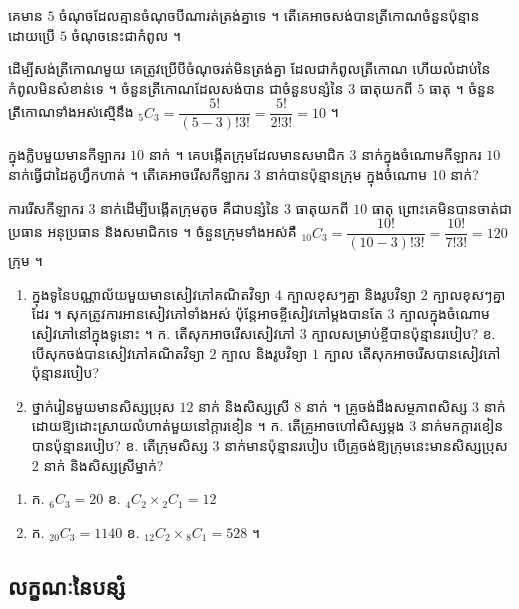 \begin{example}[លំហាត់គំរូ ១]
គេមាន $5$ ចំណុចដែលគ្មានចំណុចបីណារត់ត្រង់គ្នាទេ ។ តើគេអាចសង់បានត្រីកោណចំនួនប៉ុន្មាន ដោយប្រើ $5$ ចំណុចនេះជាកំពូល ។
\end{example}
\ans
ដើម្បីសង់ត្រីកោណមួយ គេត្រូវប្រើបីចំណុចរត់មិនត្រង់គ្នា ដែលជាកំពូលត្រីកោណ ហើយលំដាប់នៃកំពូលមិនសំខាន់ទេ ។ ចំនួនត្រីកោណដែលសង់បាន ជាចំនួនបន្សំនៃ $3$ ធាតុយកពី $5$ ធាតុ ។ ចំនួនត្រីកោណទាំងអស់ស្មើនឹង ${}_5C_3 = \dfrac{5!}{(5 - 3)!3!} = \dfrac{5!}{2!3!} = 10$ ។

\begin{example}[លំហាត់គំរូ ២]
ក្នុងក្លិបមួយមានកីឡាករ $10$ នាក់ ។ គេបង្កើតក្រុមដែលមានសមាជិក $3$ នាក់ក្នុងចំណោមកីឡាករ $10$ នាក់ធ្វើជាដៃគូហ្វឹកហាត់ ។ តើគេអាចរើសកីឡាករ $3$ នាក់បានប៉ុន្មានក្រុម ក្នុងចំណោម $10$ នាក់?
\end{example}
\ans
ការរើសកីឡាករ $3$ នាក់ដើម្បីបង្កើតក្រុមតូច គឺជាបន្សំនៃ $3$ ធាតុយកពី $10$ ធាតុ ព្រោះគេមិនបានចាត់ជាប្រធាន អនុប្រធាន និងសមាជិកទេ ។ ចំនួនក្រុមទាំងអស់គឺ ${}_{10}C_3 = \dfrac{10!}{(10 - 3)!3!} = \dfrac{10!}{7!3!} = 120$ ក្រុម ។

\begin{pro}
\begin{enumerate}[1]
  \item ក្នុងទូនៃបណ្ណាល័យមួយមានសៀវភៅគណិតវិទ្យា $4$ ក្បាលខុសៗគ្នា និងរូបវិទ្យា $2$ ក្បាលខុសៗគ្នាដែរ ។ សុកត្រូវការអានសៀវភៅទាំងអស់ ប៉ុន្តែអាចខ្ចីសៀវភៅម្ដងបានតែ $3$ ក្បាលក្នុងចំណោមសៀវភៅនៅក្នុងទូនោះ ។ ក. តើសុកអាចរើសសៀវភៅ $3$ ក្បាលសម្រាប់ខ្ចីបានប៉ុន្មានរបៀប? \quad ខ. បើសុកចង់បានសៀវភៅគណិតវិទ្យា $2$ ក្បាល និងរូបវិទ្យា $1$ ក្បាល តើសុកអាចរើសបានសៀវភៅប៉ុន្មានរបៀប?
  \item ថ្នាក់រៀនមួយមានសិស្សប្រុស $12$ នាក់ និងសិស្សស្រី $8$ នាក់ ។ គ្រូចង់ដឹងសម្ថភាពសិស្ស $3$ នាក់ ដោយឱ្យដោះស្រាយលំហាត់មួយនៅក្ដារខៀន ។ ក. តើគ្រូអាចហៅសិស្សម្ដង $3$ នាក់មកក្ដារខៀនបានប៉ុន្មានរបៀប? \quad ខ. តើក្រុមសិស្ស $3$ នាក់មានប៉ុន្មានរបៀប បើគ្រូចង់ឱ្យក្រុមនេះមានសិស្សប្រុស $2$ នាក់ និងសិស្សស្រីម្នាក់?
\end{enumerate}
\ans
\begin{enumerate}[1]
  \item ក. ${}_6C_3 = 20$ \quad ខ. ${}_4C_2\times{}_2C_1 = 12$
  \item ក. ${}_{20}C_3 = 1140$ \quad ខ. ${}_{12}C_2\times{}_8C_1 = 528$ ។
\end{enumerate}
\end{pro}

\subsection{លក្ខណៈនៃបន្សំ}

